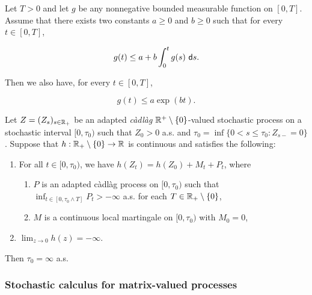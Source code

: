 
\begin{lemma} 
    \label{lemma:gronwall} 
    Let $T >0$ and let $g$ be any nonnegative bounded measurable function on $[0,T]$. Assume that there exists two constants $a\ge 0$ and $b\ge 0$ such that for every $t\in [0,T]$,

    \[ g(t) \le a + b\int_0^t g(s)~\mathsf d s. \]

    Then we also have, for every $t \in [0,T]$,

    \[ g(t) \le a \exp(bt). \]
\end{lemma}

\begin{lemma} \label{lemma:mckean}%
    Let $Z = (Z_s)_{s\in \mathbb R_+}$ be an adapted \textit{càdlàg} $\mathbb R^+\setminus \{0\}$-valued stochastic process on a stochastic interval $[0,\tau_0)$ such that $Z_0 > 0$ a.s. and $\tau_0 = \inf\{0 < s \le \tau_0 : Z_{s-} = 0\}$. Suppose that $h:\mathbb R_+\setminus\{0\}\to\mathbb R$ is continuous and satisfies the following:

    \begin{enumerate}

        \item For all $t\in[0,\tau_0)$, we have $h(Z_t) = h(Z_0) + M_t + P_t$, where 
        
        \begin{enumerate}
            \item  $P$ is an adapted càdlàg process on $[0,\tau_0)$ such that $\inf_{t\in[0,\tau_0\wedge T]} P_t > - \infty$ a.s. for each $T\in \mathbb R_+\setminus \{0\}$,
            
            \item  $M$ is a continuous local martingale on $[0,\tau_0)$ with $M_0=0$,
        \end{enumerate}
        
        \item $\lim_{z\to 0}h(z) = -\infty$.
    \end{enumerate}

    Then $\tau_0 = \infty$ a.s.
\end{lemma}

\subsubsection{Stochastic calculus for matrix-valued processes}

